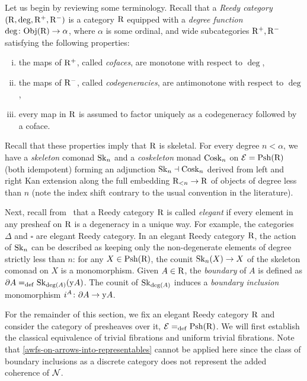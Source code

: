 \documentclass[reqno,10pt,a4paper,oneside,draft]{amsart}
\begin{document}
\medskip

Let us begin by reviewing some terminology.
Recall that a \emph{Reedy category} $(\R, \deg, \Rp, \Rm)$ is a category $\R$ equipped with a \emph{degree function} $\deg \co \obj(\R) \to \alpha$, where $\alpha$ is some ordinal, and wide subcategories $\Rp, \Rm$ satisfying the following properties:
\begin{enumerate}[(i)]
\item the maps of $\Rp$, called \emph{cofaces}, are monotone with respect to $\deg$,
\item the maps of $\Rm$, called \emph{codegeneracies}, are antimonotone with respect to $\deg$,
\item every map in $\R$ is assumed to factor uniquely as a codegeneracy followed by a coface.
\end{enumerate}
Recall that these properties imply that $\R$ is skeletal.
For every degree $n < \alpha$, we have a \emph{skeleton} comonad $\Sk_n$ and a \emph{coskeleton} monad $\Cosk_n$ on $\catE = \Psh(\R)$ (both idempotent) forming an adjunction $\Sk_n \dashv \Cosk_n$ derived from left and right Kan extension along the full embedding $\R_{<n} \to \R$ of objects of degree less than $n$ (note the index shift contrary to the usual convention in the literature).

\medskip

Next, recall from~\cite{bergner-rezk-elegant} that a Reedy category $\R$ is called \emph{elegant} if every element in any presheaf on $\R$ is a degeneracy in a unique way.
For example, the categories $\Delta$ and $\square$ are elegant Reedy category.
In an elegant Reedy category $\R$, the action of $\Sk_n$ can be described as keeping only the non-degenerate elements of degree strictly less than $n$: for any $X \in \Psh(\R)$, the counit $\Sk_n(X) \to X$ of the skeleton comonad on $X$ is a monomorphism.
Given $A \in \R$, the \emph{boundary} of $A$ is defined as $\partial A \defeq \Sk_{\deg(A)}(\yon A)$.
The counit of $\Sk_{\deg(A)}$ induces a \emph{boundary inclusion} monomorphism $i^A \co \partial A \to \yon A$.

\medskip

For the remainder of this section, we fix an elegant Reedy category $\R$ and consider the category of presheaves over it, $\calE \defeq \Rhat$.
We will first establish the classical equivalence of trivial fibrations and uniform trivial fibrations.
Note that \cref{awfs-on-arrows-into-representables} cannot be applied here since the class of boundary inclusions as a discrete category does not represent the added coherence of $\cal{N}$.
\end{document}
